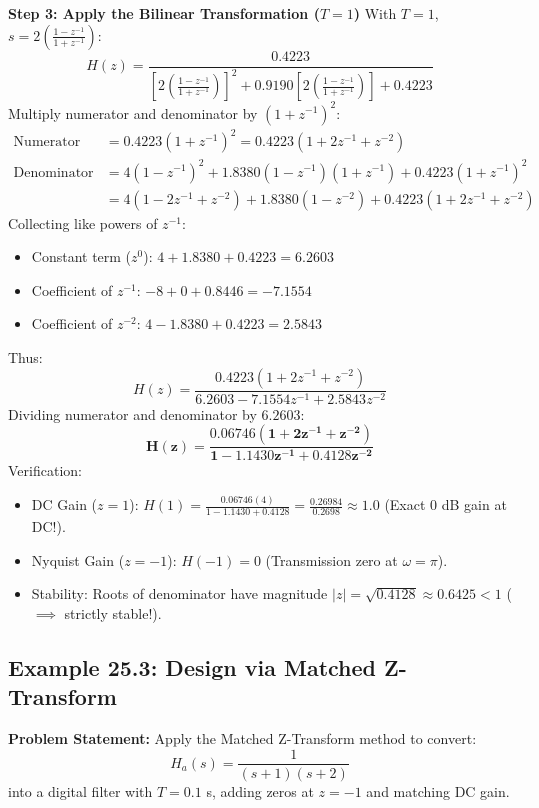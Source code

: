 \documentclass[11pt,a4paper]{article}
\begin{document}
\noindent\textbf{Step 3: Apply the Bilinear Transformation ($T = 1$)}
With $T = 1$, $s = 2\left(\frac{1 - z^{-1}}{1 + z^{-1}}\right)$:
\begin{equation}
H(z) = \frac{0.4223}{\left[2\left(\frac{1 - z^{-1}}{1 + z^{-1}}\right)\right]^2 + 0.9190\left[2\left(\frac{1 - z^{-1}}{1 + z^{-1}}\right)\right] + 0.4223}
\end{equation}
Multiply numerator and denominator by $(1 + z^{-1})^2$:
\begin{align}
\text{Numerator} &= 0.4223(1 + z^{-1})^2 = 0.4223(1 + 2z^{-1} + z^{-2}) \\
\text{Denominator} &= 4(1 - z^{-1})^2 + 1.8380(1 - z^{-1})(1 + z^{-1}) + 0.4223(1 + z^{-1})^2 \nonumber \\
&= 4(1 - 2z^{-1} + z^{-2}) + 1.8380(1 - z^{-2}) + 0.4223(1 + 2z^{-1} + z^{-2})
\end{align}
Collecting like powers of $z^{-1}$:
\begin{itemize}
    \item Constant term ($z^0$): $4 + 1.8380 + 0.4223 = \mathbf{6.2603}$
    \item Coefficient of $z^{-1}$: $-8 + 0 + 0.8446 = \mathbf{-7.1554}$
    \item Coefficient of $z^{-2}$: $4 - 1.8380 + 0.4223 = \mathbf{2.5843}$
\end{itemize}
Thus:
\begin{equation}
H(z) = \frac{0.4223(1 + 2z^{-1} + z^{-2})}{6.2603 - 7.1554 z^{-1} + 2.5843 z^{-2}}
\end{equation}
Dividing numerator and denominator by $6.2603$:
\begin{equation}
\mathbf{H(z) = \frac{0.06746(1 + 2z^{-1} + z^{-2})}{1 - 1.1430 z^{-1} + 0.4128 z^{-2}}}
\end{equation}
Verification:
\begin{itemize}
    \item DC Gain ($z = 1$): $H(1) = \frac{0.06746(4)}{1 - 1.1430 + 0.4128} = \frac{0.26984}{0.2698} \approx \mathbf{1.0}$ (Exact 0 dB gain at DC!).
    \item Nyquist Gain ($z = -1$): $H(-1) = 0$ (Transmission zero at $\omega = \pi$).
    \item Stability: Roots of denominator have magnitude $|z| = \sqrt{0.4128} \approx 0.6425 < 1$ ($\implies$ strictly stable!).
\end{itemize}

\vspace{2mm}
\subsection{Example 25.3: Design via Matched Z-Transform}
\textbf{Problem Statement:} Apply the Matched Z-Transform method to convert:
\begin{equation}
H_a(s) = \frac{1}{(s + 1)(s + 2)}
\end{equation}
into a digital filter with $T = 0.1$ s, adding zeros at $z = -1$ and matching DC gain.
\end{document}
